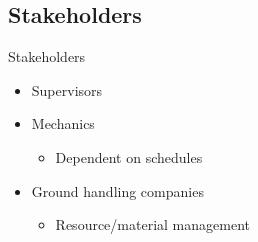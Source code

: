 \subsection{Stakeholders}
\begin{frame}{Stakeholders}{}
\begin{itemize}
	\item Supervisors
	\item Mechanics
	\begin{itemize}
		\item Dependent on schedules
	\end{itemize}
	\item Ground handling companies
	\begin{itemize}
		\item Resource/material management
	\end{itemize}
\end{itemize}
\end{frame}